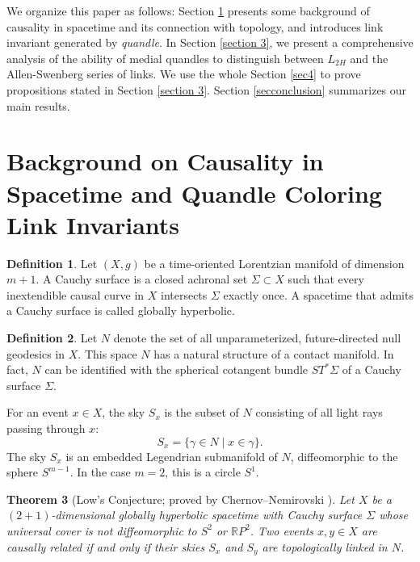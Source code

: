 \documentclass[12pt, letterpaper]{article}
\theoremstyle{plain}
\newtheorem{theorem}{Theorem}[section]
\theoremstyle{definition}
\newtheorem{definition}[theorem]{Definition}
\begin{document}
We organize this paper as follows: Section \ref{section:2} presents some background of causality in spacetime and its connection with topology, and  introduces  link invariant generated by \textit{quandle}.
In Section \ref{section 3}, we present
a comprehensive analysis of the ability of medial quandles to distinguish between $L_{2H}$ and the
Allen-Swenberg series of links. We use the whole Section \ref{sec4} to prove propositions stated in Section \ref{section 3}. Section \ref{secconclusion} summarizes our main results.

\section{Background on Causality in Spacetime and Quandle Coloring Link Invariants }\label{section:2}

\begin{definition}
Let \((X,g)\) be a time-oriented Lorentzian manifold of dimension \(m+1\). A Cauchy surface is a closed achronal set \(\Sigma \subset X\) such that every inextendible causal curve in \(X\) intersects \(\Sigma\) exactly once. A spacetime that admits a Cauchy surface is called globally hyperbolic.


 \end{definition}

 \begin{definition}
     Let \(N\) denote the set of all unparameterized, future-directed null geodesics in \(X\). This space \(N\) has a natural structure of a contact manifold. In fact, \(N\) can be identified with the spherical cotangent bundle \(ST^*\Sigma\) of a Cauchy surface \(\Sigma\).

For an event \(x \in X\), the sky \(S_x\) is the subset of \(N\) consisting of all light rays passing through \(x\):
\[
S_x = \{\gamma \in N \mid x \in \gamma\}.
\]
The sky \(S_x\) is an embedded Legendrian submanifold of \(N\), diffeomorphic to the sphere \(S^{m-1}\). In the case \(m=2\), this is a circle \(S^1\).
 \end{definition}

 \begin{theorem}[Low's Conjecture; proved by Chernov--Nemirovski \cite{CN}]
Let \(X\) be a \((2+1)\)-dimensional globally hyperbolic spacetime with Cauchy surface \(\Sigma\) whose universal cover is not diffeomorphic to \(S^2\) or \(\mathbb{R}P^2\). Two events \(x, y \in X\) are causally related if and only if their skies \(S_x\) and \(S_y\) are topologically linked in \(N\).
\end{theorem}
\end{document}
